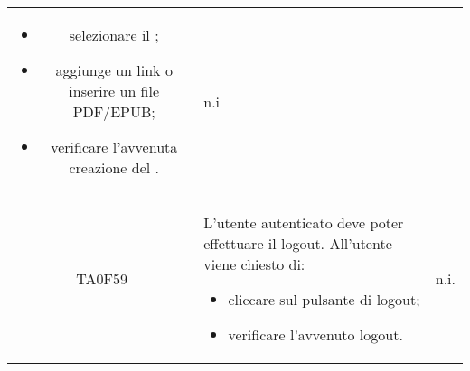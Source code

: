 \begin{center}
\begin{longtable}{ c m{12cm} c }
	\begin{itemize}										
		\item selezionare il \BKindle;										
		\item aggiunge un link o inserire un file PDF/EPUB;										
		\item verificare l'avvenuta creazione del \BKindle.						
	\end{itemize}   										& n.i\\
	TA0F59   & L'utente autenticato deve poter effettuare il logout. All'utente viene chiesto di: 										
	\begin{itemize}										
		\item cliccare sul pulsante di logout;						
		\item verificare l'avvenuto logout.						
	\end{itemize}   												                                                                     										& n.i. \\

\end{longtable}

\end{center}


